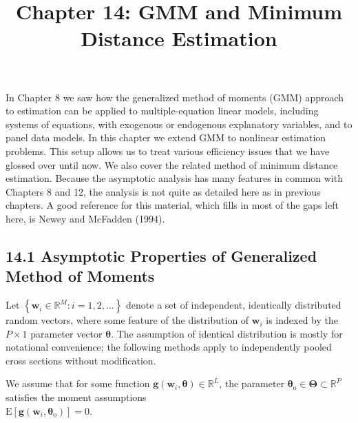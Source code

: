 \documentclass[10pt]{article}
\title{Chapter 14: GMM and Minimum Distance Estimation}
\author{}
\date{}
\begin{document}
\maketitle

In Chapter 8 we saw how the generalized method of moments (GMM) approach to estimation can be applied to multiple-equation linear models, including systems of equations, with exogenous or endogenous explanatory variables, and to panel data models. In this chapter we extend GMM to nonlinear estimation problems. This setup allows us to treat various efficiency issues that we have glossed over until now. We also cover the related method of minimum distance estimation. Because the asymptotic analysis has many features in common with Chapters 8 and 12, the analysis is not quite as detailed here as in previous chapters. A good reference for this material, which fills in most of the gaps left here, is Newey and McFadden (1994).

\subsection*{14.1 Asymptotic Properties of Generalized Method of Moments}
Let $\left\{\mathbf{w}_{i} \in \mathbb{R}^{M}: i=1,2, \ldots\right\}$ denote a set of independent, identically distributed random vectors, where some feature of the distribution of $\mathbf{w}_{i}$ is indexed by the $P \times 1$ parameter vector $\boldsymbol{\theta}$. The assumption of identical distribution is mostly for notational convenience; the following methods apply to independently pooled cross sections without modification.

We assume that for some function $\mathbf{g}\left(\mathbf{w}_{i}, \boldsymbol{\theta}\right) \in \mathbb{R}^{L}$, the parameter $\boldsymbol{\theta}_{\mathrm{o}} \in \boldsymbol{\Theta} \subset \mathbb{R}^{P}$ satisfies the moment assumptions\\
$\mathrm{E}\left[\mathbf{g}\left(\mathbf{w}_{i}, \boldsymbol{\theta}_{\mathrm{o}}\right)\right]=0$.
\end{document}
